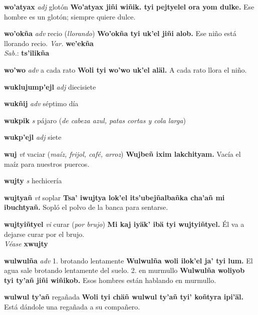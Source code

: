 \documentclass[10pt]{scrbook}
\newcommand{\entry}[1]{\textbf{#1}}
\newcommand{\onedefinition}[1]{#1.}
\newcommand{\partofspeech}[1]{\textit{#1}}
\newcommand{\spanishtranslation}[1]{#1}
\newcommand{\clarification}[1]{(\textit{#1})}
\newcommand{\cholexample}[1]{\textbf{#1}}
\newcommand{\exampletranslation}[1]{#1}
\newcommand{\dialectvariant}[1]{\\\textit{#1}:}
\newcommand{\dialectword}[1]{\textbf{#1}}
\newcommand{\alsosee}[1]{\\\textit{Véase} \textbf{#1}}
\newcommand{\variation}[1]{\textit{Var.} \textbf{#1}}
\begin{document}
\begin{multicols}{2}
\entry{wo'atyax}
\partofspeech{adj}
\spanishtranslation{glotón}
\cholexample{Wo'atyax jiñi wiñik. tyi pejtyelel ora yom dulke.}
\exampletranslation{Ese hombre es un glotón; siempre quiere dulce.}

\entry{wo'okña}
\partofspeech{adv}
\spanishtranslation{recio}
\clarification{llorando}
\cholexample{Wo'okña tyi uk'el jiñi alob.}
\exampletranslation{Ese niño está llorando recio.}
\variation{we'ekña}
\dialectvariant{Sab.}
\dialectword{ts'ilikña}

\entry{wo'wo}
\partofspeech{adv}
\spanishtranslation{a cada rato}
\cholexample{Woli tyi wo'wo uk'el aläl.}
\exampletranslation{A cada rato llora el niño.}

\entry{wuklujump'ejl}
\partofspeech{adj}
\spanishtranslation{diecisiete}

\entry{wukñij}
\partofspeech{adv}
\spanishtranslation{séptimo día}

\entry{wukpik}
\partofspeech{s}
\spanishtranslation{pájaro}
\clarification{de cabeza azul, patas cortas y cola larga}

\entry{wukp'ejl}
\partofspeech{adj}
\spanishtranslation{siete}

\entry{wuj}
\partofspeech{vt}
\spanishtranslation{vaciar}
\clarification{maíz, frijol, café, arroz}
\cholexample{Wujbeñ ixim lakchityam.}
\exampletranslation{Vacía el maíz para nuestros puercos.}

\entry{wujty}
\partofspeech{s}
\spanishtranslation{hechicería}

\entry{wujtyañ}
\partofspeech{vt}
\spanishtranslation{soplar}
\cholexample{Tsa' iwujtya lok'el its'ubejñalbañka cha'añ mi ibuchtyañ.}
\exampletranslation{Sopló el polvo de la banca para sentarse.}

\entry{wujtyiñtyel}
\partofspeech{vi}
\spanishtranslation{curar}
\clarification{por brujo}
\cholexample{Mi kaj iyäk' ibä tyi wujtyiñtyel.}
\exampletranslation{Él va a dejarse curar por el brujo.}
\alsosee{xwujty}

\entry{wulwulña}
\partofspeech{adv}
\onedefinition{1}
\spanishtranslation{brotando lentamente}
\cholexample{Wulwulña woli ilok'el ja' tyi lum.}
\exampletranslation{El agua sale brotando lentamente del suelo.}
\onedefinition{2}
\spanishtranslation{en murmullo}
\cholexample{Wulwulña woliyob tyi ty'añ jiñi wiñikob.}
\exampletranslation{Esos hombres están hablando en murmullo.}

\entry{wulwul ty'añ}
\spanishtranslation{regañada}
\cholexample{Woli tyi chäñ wulwul ty'añ tyi' koñtyra ipi'äl.}
\exampletranslation{Está dándole una regañada a su compañero.}


\end{multicols}
\end{document}
